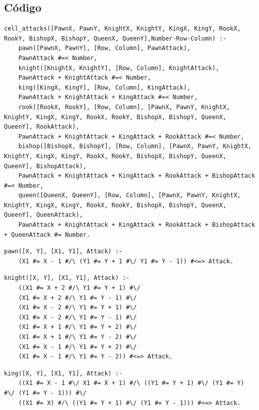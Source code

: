\documentclass[runningheads]{llncs}
\begin{document}
\newpage
\subsection{Código}
\begin{lstlisting}[caption={Cell Attacks}]
    cell_attacks([PawnX, PawnY, KnightX, KnightY, KingX, KingY, RookX, RookY, BishopX, BishopY, QueenX, QueenY],Number-Row-Column) :-
    pawn([PawnX, PawnY], [Row, Column], PawnAttack),
    PawnAttack #=< Number,
    knight([KnightX, KnightY], [Row, Column], KnightAttack),
    PawnAttack + KnightAttack #=< Number,
    king([KingX, KingY], [Row, Column], KingAttack),
    PawnAttack + KnightAttack + KingAttack #=< Number,
    rook([RookX, RookY], [Row, Column], [PawnX, PawnY, KnightX, KnightY, KingX, KingY, RookX, RookY, BishopX, BishopY, QueenX, QueenY], RookAttack),
    PawnAttack + KnightAttack + KingAttack + RookAttack #=< Number,
    bishop([BishopX, BishopY], [Row, Column], [PawnX, PawnY, KnightX, KnightY, KingX, KingY, RookX, RookY, BishopX, BishopY, QueenX, QueenY], BishopAttack),
    PawnAttack + KnightAttack + KingAttack + RookAttack + BishopAttack #=< Number,
    queen([QueenX, QueenY], [Row, Column], [PawnX, PawnY, KnightX, KnightY, KingX, KingY, RookX, RookY, BishopX, BishopY, QueenX, QueenY], QueenAttack),
    PawnAttack + KnightAttack + KingAttack + RookAttack + BishopAttack + QueenAttack #= Number.
\end{lstlisting}

\begin{lstlisting}[caption={Pawn Attack}]
    pawn([X, Y], [X1, Y1], Attack) :-
    (X1 #= X - 1 #/\ (Y1 #= Y + 1 #\/ Y1 #= Y - 1)) #<=> Attack.
\end{lstlisting}

\begin{lstlisting}[caption={Knight Attack}]
    knight([X, Y], [X1, Y1], Attack) :-
    ((X1 #= X + 2 #/\ Y1 #= Y + 1) #\/ 
    (X1 #= X + 2 #/\ Y1 #= Y - 1) #\/ 
    (X1 #= X - 2 #/\ Y1 #= Y + 1) #\/ 
    (X1 #= X - 2 #/\ Y1 #= Y - 1) #\/ 
    (X1 #= X + 1 #/\ Y1 #= Y + 2) #\/ 
    (X1 #= X + 1 #/\ Y1 #= Y - 2) #\/ 
    (X1 #= X - 1 #/\ Y1 #= Y + 2) #\/ 
    (X1 #= X - 1 #/\ Y1 #= Y - 2)) #<=> Attack.
\end{lstlisting}

\newpage
\begin{lstlisting}[caption={King Attack}]
    king([X, Y], [X1, Y1], Attack) :-
    ((X1 #= X - 1 #\/ X1 #= X + 1) #/\ ((Y1 #= Y + 1) #\/ (Y1 #= Y) #\/ (Y1 #= Y - 1))) #\/
    ((X1 #= X) #/\ ((Y1 #= Y + 1) #\/ (Y1 #= Y - 1))) #<=> Attack.
\end{lstlisting}
\end{document}
